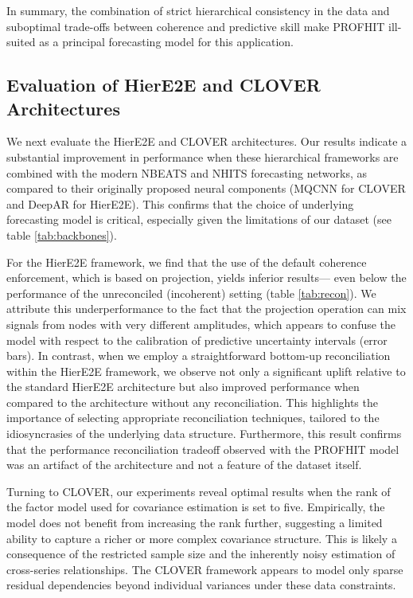 \documentclass[letterpaper]{article}
\begin{document}
In summary, the combination of strict hierarchical consistency in the data and suboptimal trade-offs between coherence and predictive skill make PROFHIT ill-suited as a principal forecasting model for this application.

\subsection{Evaluation of HierE2E and CLOVER Architectures}

We next evaluate the HierE2E and CLOVER architectures. Our results indicate a substantial improvement in performance when these hierarchical frameworks are combined with the modern NBEATS and NHITS forecasting networks, as compared to their originally proposed neural components (MQCNN for CLOVER and DeepAR for HierE2E). This confirms that the choice of underlying forecasting model is critical, especially given the limitations of our dataset (see table \ref{tab:backbones}).

For the HierE2E framework, we find that the use of the default coherence enforcement, which is based on projection, yields inferior results— even below the performance of the unreconciled (incoherent) setting (table \ref{tab:recon}). We attribute this underperformance to the fact that the projection operation can mix signals from nodes with very different amplitudes, which appears to confuse the model with respect to the calibration of predictive uncertainty intervals (error bars). In contrast, when we employ a straightforward bottom-up reconciliation within the HierE2E framework, we observe not only a significant uplift relative to the standard HierE2E architecture but also improved performance when compared to the architecture without any reconciliation. This highlights the importance of selecting appropriate reconciliation techniques, tailored to the idiosyncrasies of the underlying data structure. Furthermore, this result confirms that the performance reconciliation tradeoff observed with the PROFHIT model was an artifact of the architecture and not a feature of the dataset itself. 

Turning to CLOVER, our experiments reveal optimal results when the rank of the factor model used for covariance estimation is set to five. Empirically, the model does not benefit from increasing the rank further, suggesting a limited ability to capture a richer or more complex covariance structure. This is likely a consequence of the restricted sample size and the inherently noisy estimation of cross-series relationships. The CLOVER framework appears to model only sparse residual dependencies beyond individual variances under these data constraints.
\end{document}
